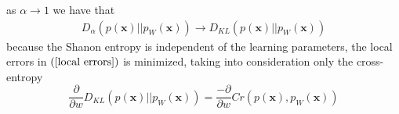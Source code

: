 \documentclass[english]{HSMW-Thesis}
\begin{document}
as $\alpha\rightarrow 1$ we have that
\begin{align*}
	D_{\alpha}\left( p\left( \mathbf{x}\right) ||p_{W}\left( \mathbf{x}\right) \right)\rightarrow D_{KL}\left( p\left( \mathbf{x}\right) ||p_{W}\left( \mathbf{x}\right) \right)
\end{align*}
because the Shanon entropy is independent of the learning parameters, the local errors in $\left(\ref{local errors}\right) $ is minimized, taking into consideration only the cross-entropy
\begin{equation}\label{cross entropy}
	\frac{\partial}{\partial w}D_{KL}\left( p\left( \mathbf{x}\right) ||p_{W}\left( \mathbf{x}\right) \right)=\frac{-\partial}{\partial w}Cr\left( p\left( \mathbf{x}\right) ,p_{W}\left( \mathbf{x}\right) \right) 
\end{equation}
\end{document}
